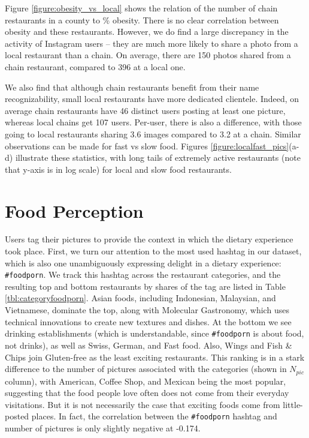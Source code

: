 \documentclass{sig-alternate-2013}
\begin{document}
Figure \ref{figure:obesity_vs_local} shows the relation of the number of chain restaurants in a county to \% obesity. There is no clear correlation between obesity and these restaurants. However, we do find a large discrepancy in the activity of Instagram users -- they are much more likely to share a photo from a local restaurant than a chain. On average, there are 150 photos shared from a chain restaurant, compared to 396 at a local one.

We also find that although chain restaurants benefit from their name recognizability, small local restaurants have more dedicated clientele. Indeed, on average chain restaurants have 46 distinct users posting at least one picture, whereas local chains get 107 users. Per-user, there is also a difference, with those going to local restaurants sharing 3.6 images compared to 3.2 at a chain. Similar observations can be made for fast vs slow food. Figures \ref{figure:localfast_pics}(a-d) illustrate these statistics, with long tails of extremely active restaurants (note that y-axis is in log scale) for local and slow food restaurants.




\section{Food Perception}
\label{sec:perception}


Users tag their pictures to provide the context in which the dietary experience took place. First, we turn our attention to the most used hashtag in our dataset, which is also one unambiguously expressing delight in a dietary experience: \texttt{\#foodporn}. We track this hashtag across the restaurant categories, and the resulting top and bottom restaurants by shares of the tag are listed in Table \ref{tbl:categoryfoodporn}. Asian foods, including Indonesian, Malaysian, and Vietnamese, dominate the top, along with Molecular Gastronomy, which uses technical innovations to create new textures and dishes. At the bottom we see drinking establishments (which is understandable, since \texttt{\#foodporn} is about food, not drinks), as well as Swiss, German, and Fast food. Also, Wings and Fish \& Chips join Gluten-free as the least exciting restaurants. This ranking is in a stark difference to the number of pictures associated with the categories (shown in $N_{pic}$ column), with American, Coffee Shop, and Mexican being the most popular, suggesting that the food people love often does not come from their everyday visitations. But it is not necessarily the case that exciting foods come from little-posted places. In fact, the correlation between the \texttt{\#foodporn} hashtag and number of pictures is only slightly negative at -0.174. 
\end{document}
